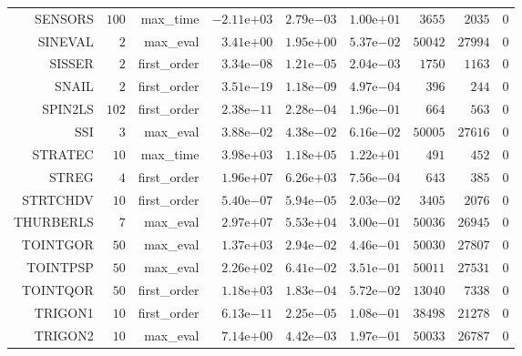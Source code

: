 \begin{longtable}{rrrrrrrrr}
SENSORS & \(   100\) & max\_time & \(-2.11\)e\(+03\) & \( 2.79\)e\(-03\) & \( 1.00\)e\(+01\) & \(  3655\) & \(  2035\) & \(     0\) \\
SINEVAL & \(     2\) & max\_eval & \( 3.41\)e\(+00\) & \( 1.95\)e\(+00\) & \( 5.37\)e\(-02\) & \( 50042\) & \( 27994\) & \(     0\) \\
SISSER & \(     2\) & first\_order & \( 3.34\)e\(-08\) & \( 1.21\)e\(-05\) & \( 2.04\)e\(-03\) & \(  1750\) & \(  1163\) & \(     0\) \\
SNAIL & \(     2\) & first\_order & \( 3.51\)e\(-19\) & \( 1.18\)e\(-09\) & \( 4.97\)e\(-04\) & \(   396\) & \(   244\) & \(     0\) \\
SPIN2LS & \(   102\) & first\_order & \( 2.38\)e\(-11\) & \( 2.28\)e\(-04\) & \( 1.96\)e\(-01\) & \(   664\) & \(   563\) & \(     0\) \\
SSI & \(     3\) & max\_eval & \( 3.88\)e\(-02\) & \( 4.38\)e\(-02\) & \( 6.16\)e\(-02\) & \( 50005\) & \( 27616\) & \(     0\) \\
STRATEC & \(    10\) & max\_time & \( 3.98\)e\(+03\) & \( 1.18\)e\(+05\) & \( 1.22\)e\(+01\) & \(   491\) & \(   452\) & \(     0\) \\
STREG & \(     4\) & first\_order & \( 1.96\)e\(+07\) & \( 6.26\)e\(+03\) & \( 7.56\)e\(-04\) & \(   643\) & \(   385\) & \(     0\) \\
STRTCHDV & \(    10\) & first\_order & \( 5.40\)e\(-07\) & \( 5.94\)e\(-05\) & \( 2.03\)e\(-02\) & \(  3405\) & \(  2076\) & \(     0\) \\
THURBERLS & \(     7\) & max\_eval & \( 2.97\)e\(+07\) & \( 5.53\)e\(+04\) & \( 3.00\)e\(-01\) & \( 50036\) & \( 26945\) & \(     0\) \\
TOINTGOR & \(    50\) & max\_eval & \( 1.37\)e\(+03\) & \( 2.94\)e\(-02\) & \( 4.46\)e\(-01\) & \( 50030\) & \( 27807\) & \(     0\) \\
TOINTPSP & \(    50\) & max\_eval & \( 2.26\)e\(+02\) & \( 6.41\)e\(-02\) & \( 3.51\)e\(-01\) & \( 50011\) & \( 27531\) & \(     0\) \\
TOINTQOR & \(    50\) & first\_order & \( 1.18\)e\(+03\) & \( 1.83\)e\(-04\) & \( 5.72\)e\(-02\) & \( 13040\) & \(  7338\) & \(     0\) \\
TRIGON1 & \(    10\) & first\_order & \( 6.13\)e\(-11\) & \( 2.25\)e\(-05\) & \( 1.08\)e\(-01\) & \( 38498\) & \( 21278\) & \(     0\) \\
TRIGON2 & \(    10\) & max\_eval & \( 7.14\)e\(+00\) & \( 4.42\)e\(-03\) & \( 1.97\)e\(-01\) & \( 50033\) & \( 26787\) & \(     0\) \\

\end{longtable}
